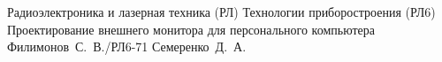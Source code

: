 \documentclass{bmstu}
\begin{document}
\renewcommand{\labelenumii}{\arabic{enumi}.\arabic{enumii}}
\renewcommand{\labelenumiii}{\arabic{enumi}.\arabic{enumii}.\arabic{enumiii}}
\renewcommand{\labelenumiv}{\arabic{enumi}.\arabic{enumii}.\arabic{enumiii}.\arabic{enumiv}}

\makecourseworktitle
	{Радиоэлектроника и лазерная техника (РЛ)}
	{Технологии приборостроения (РЛ6)}
	{Проектирование внешнего монитора для персонального компьютера}
	{Филимонов~С.~В./РЛ6-71}
	{Семеренко~Д.~А.}
	{}
	{}
	{}

\maketableofcontents

%
%




\end{document}
